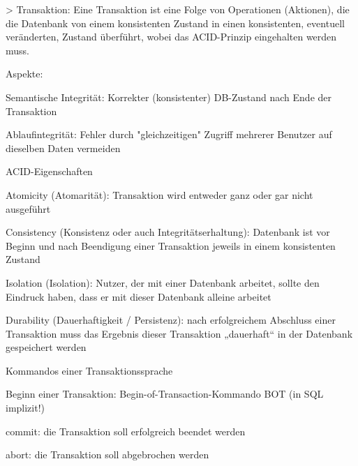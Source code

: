 \documentclass[a4paper]{article}
\begin{document}
\begin{multicols}{3}
\begin{itemize*}
        > Transaktion: Eine Transaktion ist eine Folge von Operationen (Aktionen), die die Datenbank von einem konsistenten Zustand in einen konsistenten, eventuell veränderten, Zustand überführt, wobei das ACID-Prinzip eingehalten werden muss.
        \begin{itemize*}
            \item Aspekte:
            \begin{itemize*}
                \item Semantische Integrität: Korrekter (konsistenter) DB-Zustand nach Ende der Transaktion
                \item Ablaufintegrität: Fehler durch "gleichzeitigen" Zugriff mehrerer Benutzer auf dieselben Daten vermeiden
            \end{itemize*}
            \item ACID-Eigenschaften
            \begin{itemize*}
                \item Atomicity (Atomarität): Transaktion wird entweder ganz oder gar nicht ausgeführt
                \item Consistency (Konsistenz oder auch Integritätserhaltung): Datenbank ist vor Beginn und nach Beendigung einer Transaktion jeweils in einem konsistenten Zustand
                \item Isolation (Isolation): Nutzer, der mit einer Datenbank arbeitet, sollte den Eindruck haben, dass er mit dieser Datenbank alleine arbeitet
                \item Durability (Dauerhaftigkeit / Persistenz): nach erfolgreichem Abschluss einer Transaktion muss das Ergebnis dieser Transaktion „dauerhaft“ in der Datenbank gespeichert werden
            \end{itemize*}
            \item Kommandos einer Transaktionssprache
            \begin{itemize*}
                \item Beginn einer Transaktion: Begin-of-Transaction-Kommando BOT (in SQL implizit!)
                \item commit: die Transaktion soll erfolgreich beendet werden
                \item abort: die Transaktion soll abgebrochen werden
            \end{itemize*}
        \end{itemize*}


\end{itemize*}
\end{multicols}
\end{document}
